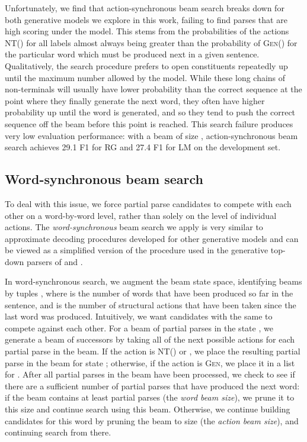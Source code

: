 \documentclass[11pt,a4paper]{article}
\begin{document}
Unfortunately, we find that action-synchronous beam search breaks down for both generative models we explore in this work, failing to find parses that are high scoring under the model. This stems from the probabilities of the actions \textsc{NT()} for all labels  almost always being greater than the probability of \textsc{Gen()} for the particular word  which must be produced next in a given sentence. Qualitatively, the search procedure prefers to open constituents repeatedly up until the maximum number allowed by the model. 
While these long chains of non-terminals will usually have lower probability than the correct sequence at the point where they finally generate the next word, they often have higher probability up until the word is generated, and so they tend to push the correct sequence off the beam before this point is reached.
This search failure produces very low evaluation performance: with a beam of size , action-synchronous beam search achieves 29.1 F1 for RG and 27.4 F1 for LM on the development set.

\subsection{Word-synchronous beam search}
\label{sec:word-level-beam}
To deal with this issue, we force partial parse candidates to compete with each other on a word-by-word level, rather than solely on the level of individual actions. The \emph{word-synchronous} beam search we apply 
is very similar to approximate decoding procedures developed for other generative models \cite{henderson2003inducing,titov2010latent,buys2015generative} and can be viewed as a simplified version of the procedure used in the generative top-down parsers of \citet{roark2001probabilistic} and \citet{charniak2010top}.

In word-synchronous search, we augment the beam state space, identifying beams by tuples , where  is the number of words that have been produced so far in the sentence, and  is the number of structural actions that have been taken since the last word was produced. Intuitively, we want candidates with the same  to compete against each other. For a beam of partial parses in the state , we generate a beam of successors by taking all of the next possible actions for each partial parse in the beam. If the action is \textsc{NT}() or , we place the resulting partial parse in the beam for state ; otherwise, if the action is  \textsc{Gen}, we place it in a list for . After all partial parses in the beam have been processed, we check to see if there are a sufficient number of partial parses that have produced the next word: if the beam  contains at least  partial parses (the \emph{word beam size}), we prune it to this size and continue search using this beam. Otherwise, we continue building candidates for this word by pruning the beam  to size  (the \emph{action beam size}), and continuing search from there.
\end{document}
